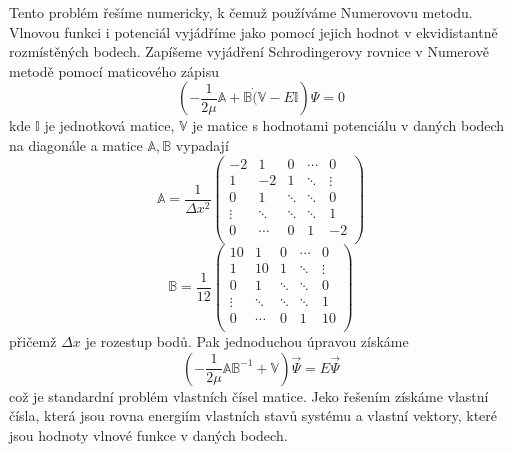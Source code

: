Tento problém řešíme numericky, k čemuž používáme Numerovovu metodu.
Vlnovou funkci i potenciál vyjádříme jako pomocí jejich hodnot v ekvidistantně rozmístěných 
bodech.
Zapíšeme vyjádření Schrodingerovy rovnice v Numerově metodě pomocí maticového zápisu
\begin{equation}
(-\frac{1}{2\mu}\mathbb{A} + \mathbb{B}\dot(\mathbb{V} - E\mathbb{I})\Psi = 0
\end{equation}
kde $\mathbb{I}$ je jednotková matice, $\mathbb{V}$ je matice s hodnotami potenciálu v daných bodech na diagonále a 
matice $\mathbb{A},\mathbb{B}$ vypadají
$$ \mathbb{A} = \frac{1}{\Delta x^2}\begin{pmatrix}
-2 & 1 & 0 & \cdots & 0 \\  
1 & -2 & 1 & \ddots & \vdots \\ 
0 & 1 & \ddots & \ddots & 0 \\  
\vdots & \ddots & \ddots & \ddots & 1 \\ 
0 & \cdots & 0 & 1 & -2 \\ 
\end{pmatrix}
$$
$$
\mathbb{B} = 
\frac{1}{12}
\begin{pmatrix}
10 & 1 & 0 & \cdots & 0 \\ 
1 & 10 & 1 & \ddots & \vdots \\ 
0 & 1 & \ddots & \ddots & 0 \\ 
\vdots & \ddots & \ddots & \ddots & 1 \\  
0 & \cdots & 0 & 1 & 10 \\ 
\end{pmatrix}
$$
přičemž $\Delta x$ je rozestup bodů. Pak jednoduchou úpravou získáme
\begin{equation}
\left(-\frac{1}{2\mu}\mathbb{A}\mathbb{B}^{-1}+\mathbb{V}\right)\vec{\Psi} = E 
\vec{\Psi}
\end{equation}
což je standardní problém vlastních čísel matice.
Jeko řešením získáme vlastní čísla, která jsou rovna energiím vlastních stavů systému 
a vlastní vektory, které jsou hodnoty vlnové funkce v daných bodech.
